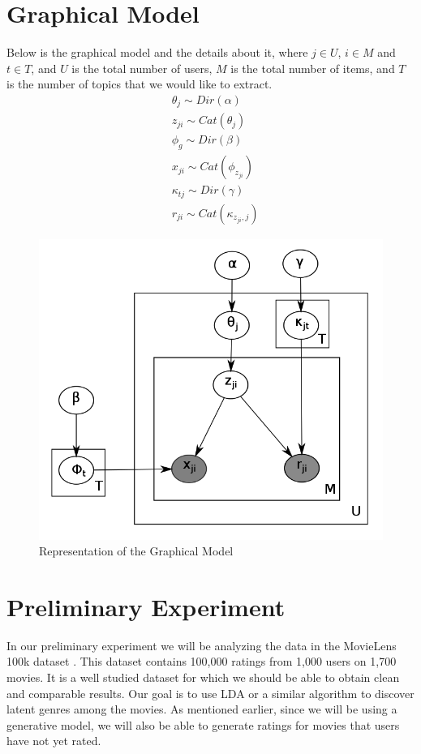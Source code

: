 \documentclass{article} %
\begin{document}
\section{Graphical Model}
\label{graph}
Below is the graphical model and the details about it, where $j \in U$, $i \in M$ 
and $t \in T$, and $U$ is the total number of users, $M$ is the total number of items, 
and $T$ is the number of topics that we would like to extract. 
\begin{align*}
  &\theta_j \sim Dir(\alpha)\\
  &z_{ji} \sim Cat(\theta_j)\\
  &\phi_g \sim Dir(\beta)\\
  &x_{ji} \sim Cat(\phi_{z_{ji}}) \\
  &\kappa_{tj} \sim Dir(\gamma)\\
  &r_{ji} \sim Cat(\kappa_{z_{ji},j})
\end{align*}
\clearpage
\begin{figure}[h]
    \begin{center}
      \includegraphics[width=.5\textwidth]{model.png}
      \caption{Representation of the Graphical Model}
      \label{fig:plot1}
    \end{center}
  \end{figure}

\section{Preliminary Experiment}
\label{exp}
In our preliminary experiment we will be analyzing the data in the MovieLens 100k
dataset \cite{movielens100k}. This dataset contains 100,000 ratings from 1,000
users on 1,700 movies. It is a well studied dataset for which we should be able
to obtain clean and comparable results. Our goal is to use LDA or a similar
algorithm to discover latent genres among the movies. As mentioned earlier,
since we will be using a generative model, we will also be able to generate
ratings for movies that users have not yet rated.
\end{document}
